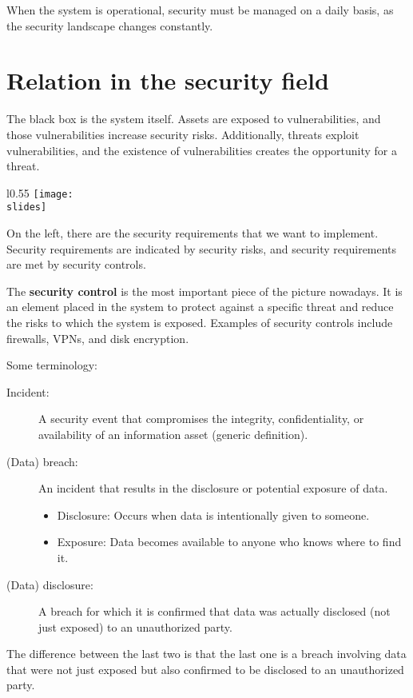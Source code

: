 When the system is operational, security must be managed on a daily basis, as the security landscape changes constantly.


\section{Relation in the security field}

The black box is the system itself.
Assets are exposed to vulnerabilities, and those vulnerabilities increase security risks. 
Additionally, threats exploit vulnerabilities, and the existence of vulnerabilities creates the opportunity for a threat.
\begin{wrapfigure}{l}{0.55\textwidth}
  \centering
      \texttt{[image: \\slides]}
  \end{wrapfigure}
On the left, there are the security requirements that we want to implement. Security requirements are indicated by security risks, and security requirements are met by security controls.

The \textbf{security control} is the most important piece of the picture nowadays. It is an element placed in the system to protect against a specific threat and reduce the risks to which the system is exposed. Examples of security controls include firewalls, VPNs, and disk encryption.

\bigskip
Some terminology:
\begin{description}
  \item[Incident:] A security event that compromises the integrity, confidentiality, or availability of an information asset (generic definition).
  \item[(Data) breach:] An incident that results in the disclosure or potential exposure of data.
    \begin{itemize}
      \item Disclosure: Occurs when data is intentionally given to someone.
      \item Exposure: Data becomes available to anyone who knows where to find it.
    \end{itemize}
  \item[(Data) disclosure:] A breach for which it is confirmed that data was actually disclosed (not just exposed) to an unauthorized party.
\end{description}
The difference between the last two is that the last one is a breach involving data that were not just exposed but also confirmed to be disclosed to an unauthorized party.


